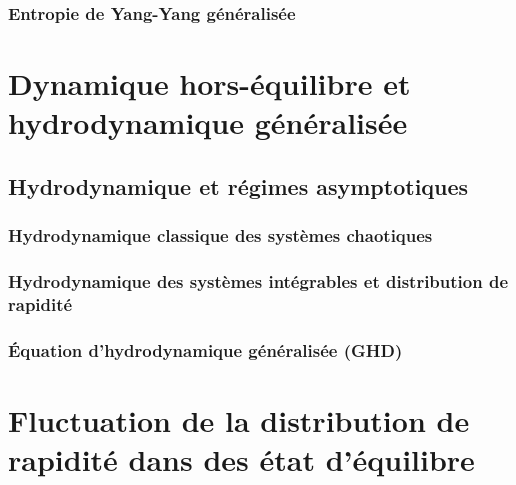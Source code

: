 \subsection{Entropie de Yang-Yang généralisée}



\chapter{Dynamique hors-équilibre et hydrodynamique généralisée}
\minitoc
\section{Hydrodynamique et régimes asymptotiques}

\subsection{Hydrodynamique classique des systèmes chaotiques}
\subsection{Hydrodynamique des systèmes intégrables et distribution de rapidité}
\subsection{Équation d’hydrodynamique généralisée (GHD)}

\chapter{Fluctuation de la distribution de rapidité dans des état d'équilibre} 



